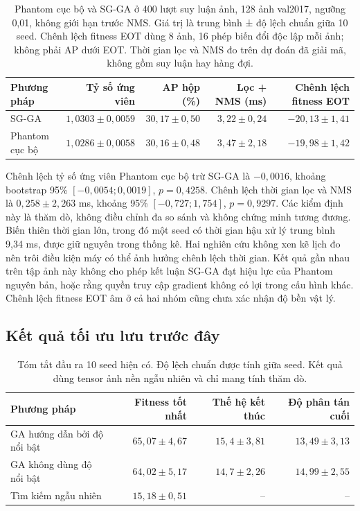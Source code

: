 \documentclass[a4paper,fleqn]{cas-dc}
\begin{document}
\begin{table}[t]
\centering
\small
\caption{Phantom cục bộ và SG-GA ở 400 lượt suy luận ảnh, 128 ảnh val2017, ngưỡng 0,01, không giới hạn trước NMS. Giá trị là trung bình ± độ lệch chuẩn giữa 10 seed. Chênh lệch fitness EOT dùng 8 ảnh, 16 phép biến đổi độc lập mỗi ảnh; không phải AP dưới EOT. Thời gian lọc và NMS đo trên dự đoán đã giải mã, không gồm suy luận hay hàng đợi.}
\begin{tabularx}{\textwidth}{Xrrrr}
\toprule
Phương pháp & Tỷ số ứng viên & AP hộp (\%) & Lọc + NMS (ms) & Chênh lệch fitness EOT \\
\midrule
SG-GA & $1{,}0303\pm0{,}0059$ & $30{,}17\pm0{,}50$ & $3{,}22\pm0{,}24$ & $-20{,}13\pm1{,}41$ \\
Phantom cục bộ & $1{,}0286\pm0{,}0058$ & $30{,}16\pm0{,}48$ & $3{,}47\pm2{,}18$ & $-19{,}98\pm1{,}42$ \\
\bottomrule
\end{tabularx}
\label{tab:phantom_local}
\end{table}

Chênh lệch tỷ số ứng viên Phantom cục bộ trừ SG-GA là $-0{,}0016$, khoảng bootstrap 95\% $[-0{,}0054;0{,}0019]$, $p=0{,}4258$. Chênh lệch thời gian lọc và NMS là $0{,}258\pm2{,}263$ ms, khoảng 95\% $[-0{,}727;1{,}754]$, $p=0{,}9297$. Các kiểm định này là thăm dò, không điều chỉnh đa so sánh và không chứng minh tương đương. Biến thiên thời gian lớn, trong đó một seed có thời gian hậu xử lý trung bình 9,34 ms, được giữ nguyên trong thống kê. Hai nghiên cứu không xen kẽ lịch đo nên trôi điều kiện máy có thể ảnh hưởng chênh lệch thời gian. Kết quả gần nhau trên tập ảnh này không cho phép kết luận SG-GA đạt hiệu lực của Phantom nguyên bản, hoặc rằng quyền truy cập gradient không có lợi trong cấu hình khác. Chênh lệch fitness EOT âm ở cả hai nhóm cũng chưa xác nhận độ bền vật lý.

\subsection{Kết quả tối ưu lưu trước đây}

\begin{table}[t]
\centering
\caption{Tóm tắt đầu ra 10 seed hiện có. Độ lệch chuẩn được tính giữa seed. Kết quả dùng tensor ảnh nền ngẫu nhiên và chỉ mang tính thăm dò.}
\begin{tabularx}{\textwidth}{Xrrr}
\toprule
Phương pháp & Fitness tốt nhất & Thế hệ kết thúc & Độ phân tán cuối \\
\midrule
GA hướng dẫn bởi độ nổi bật & $65{,}07\pm4{,}67$ & $15{,}4\pm3{,}81$ & $13{,}49\pm3{,}13$ \\
GA không dùng độ nổi bật & $64{,}02\pm5{,}17$ & $14{,}7\pm2{,}26$ & $14{,}99\pm2{,}55$ \\
Tìm kiếm ngẫu nhiên & $15{,}18\pm0{,}51$ & -- & -- \\
\bottomrule
\end{tabularx}
\label{tab:optimizer}
\end{table}
\end{document}
